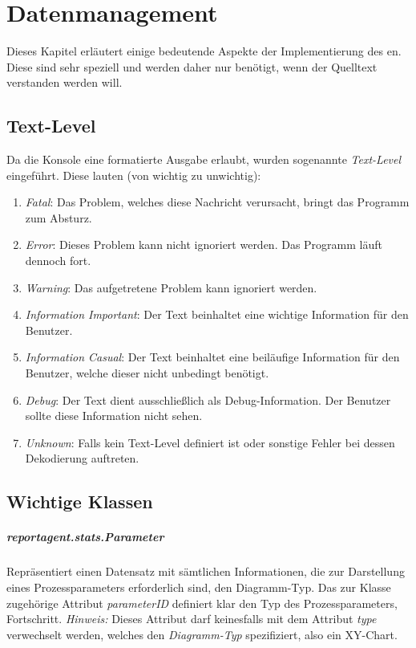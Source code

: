 	\appendix
	\chapter{Datenmanagement}
	Dieses Kapitel erläutert einige bedeutende Aspekte der Implementierung des \repag{}en. Diese sind sehr speziell und werden daher nur benötigt, wenn der Quelltext verstanden werden will.
	
	\section{Text-Level}\label{kap_textlevels}
	Da die Konsole eine formatierte Ausgabe erlaubt, wurden sogenannte \emph{Text-Level} eingeführt. Diese lauten (von wichtig zu unwichtig):
	
	\begin{enumerate}
		\item \emph{Fatal}: Das Problem, welches diese Nachricht verursacht, bringt das Programm zum Absturz.
		\item \emph{Error}: Dieses Problem kann nicht ignoriert werden. Das Programm läuft dennoch fort.
		\item \emph{Warning}: Das aufgetretene Problem kann ignoriert werden.
		\item \emph{Information Important}: Der Text beinhaltet eine wichtige Information für den Benutzer.
		\item \emph{Information Casual}: Der Text beinhaltet eine beiläufige Information für den Benutzer, welche dieser nicht unbedingt benötigt.
		\item \emph{Debug}: Der Text dient ausschließlich als Debug-Information. Der Benutzer sollte diese Information nicht sehen.
		\item \emph{Unknown}: Falls kein Text-Level definiert ist oder sonstige Fehler bei dessen Dekodierung auftreten.
	\end{enumerate}
	
	\section{Wichtige Klassen}\label{kap_impCl}
	\paragraph{reportagent.stats.Parameter}
	Repräsentiert einen Datensatz mit sämtlichen Informationen, die zur Darstellung eines Prozessparameters erforderlich sind, \zB{} den Diagramm-Typ. Das zur Klasse zugehörige Attribut \emph{parameterID} definiert klar den Typ des Prozessparameters, \zB{} Fortschritt.\parag{}
	\emph{Hinweis:} Dieses Attribut darf keinesfalls mit dem Attribut \emph{type} verwechselt werden, welches den \emph{Diagramm-Typ} spezifiziert, also \zB{} ein XY-Chart.

